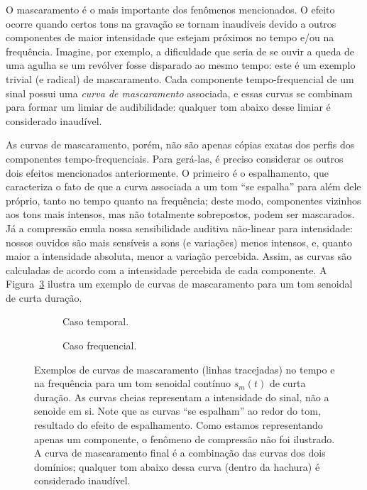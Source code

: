 O mascaramento é o mais importante dos fenômenos mencionados. O efeito ocorre quando
certos tons na gravação se tornam inaudíveis devido a outros componentes de maior
intensidade que estejam próximos no tempo e/ou na frequência. Imagine, por exemplo, a
dificuldade que seria de se ouvir a queda de uma agulha se um revólver fosse disparado
ao mesmo tempo: este é um exemplo trivial (e radical) de mascaramento. Cada componente
tempo-frequencial de um sinal possui uma \emph{curva de mascaramento} associada, e
essas curvas se combinam para formar um limiar de audibilidade: qualquer tom abaixo
desse limiar é considerado inaudível.

As curvas de mascaramento, porém, não são apenas cópias exatas dos perfis dos
componentes tempo-frequenciais. Para gerá-las, é preciso considerar os outros dois
efeitos mencionados anteriormente. O primeiro é o espalhamento, que caracteriza o fato
de que a curva associada a um tom ``se espalha'' para além dele próprio, tanto no tempo
quanto na frequência; deste modo, componentes vizinhos aos tons mais intensos, mas não
totalmente sobrepostos, podem ser mascarados. Já a compressão emula nossa sensibilidade
auditiva não-linear para intensidade: nossos ouvidos são mais sensíveis a sons (e
variações) menos intensos, e, quanto maior a intensidade absoluta, menor a variação
percebida. Assim, as curvas são calculadas de acordo com a intensidade percebida de
cada componente. A Figura~\ref{fig:metrics:masking} ilustra um exemplo de curvas de
mascaramento para um tom senoidal de curta duração.
\begin{figure}[!ht]
	\centering
	\begin{subfigure}[t]{\textwidth}
		\centering
		
		\caption{Caso temporal.}
		\label{fig:metrics:time-masking}
	\end{subfigure}

	\medskip

	\begin{subfigure}[t]{\textwidth}
		\centering
		
		\caption{Caso frequencial.}
		\label{fig:metrics:frequency-masking}
	\end{subfigure}

	\caption[Exemplos de curvas de mascaramento no tempo e na frequência]{Exemplos de curvas de mascaramento (linhas tracejadas) no tempo e na frequência para um tom senoidal contínuo $s_m(t)$ de curta duração. As curvas cheias representam a intensidade do sinal, não a senoide em si. Note que as curvas ``se espalham'' ao redor do tom, resultado do efeito de espalhamento. Como estamos representando apenas um componente, o fenômeno de compressão não foi ilustrado. A curva de mascaramento final é a combinação das curvas dos dois domínios; qualquer tom abaixo dessa curva (dentro da hachura) é considerado inaudível.}
	\label{fig:metrics:masking}
\end{figure}

